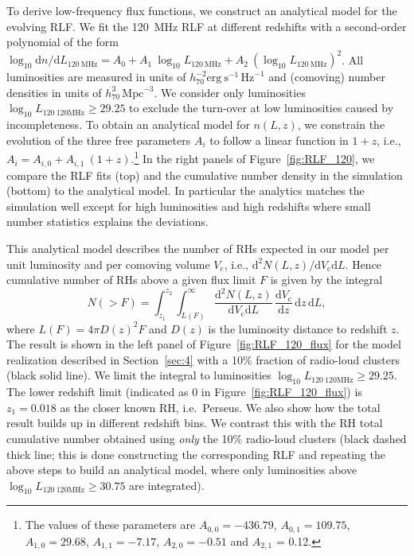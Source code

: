 \documentclass[traditabstract]{aa}
\newcommand{\rmn}{\mathrm}
\begin{document}
To derive low-frequency flux functions, we construct an analytical model for the
evolving RLF. We fit the 120~MHz RLF at different redshifts with a second-order
polynomial of the form $\log_{10} \rmn{d}n/\rmn{d}L_{120~\rmn{MHz}} = A_{0} +
A_{1}~\log_{10} L_{120~\rmn{MHz}} + A_{2}~(\log_{10} L_{120~\rmn{MHz}})^{2}$.
All luminosities are measured in units of $h_{70}^{-2}
\rmn{erg~s}^{-1}\,\rmn{Hz}^{-1}$ and (comoving) number densities in units of
$h_{70}^{3}\,\rmn{Mpc}^{-3}$. We consider only luminosities $\log_{10}
L_{120~\rmn{120MHz}} \geq 29.25$ to exclude the turn-over at low luminosities
caused by incompleteness. To obtain an analytical model for $n(L,z)$, we
constrain the evolution of the three free parameters $A_i$ to follow a linear
function in $1+z$, i.e., $A_{i} = A_{i,0} + A_{i,1}~(1+z)$.\footnote{The values
  of these parameters are $A_{0,0} = -436.79$, $A_{0,1} = 109.75$, $A_{1,0} =
  29.68$, $A_{1,1} = -7.17$, $A_{2,0} = -0.51$ and $A_{2,1}$ = 0.12.} In the
right panels of Figure~\ref{fig:RLF_120}, we compare the RLF fits (top) and the
cumulative number density in the simulation (bottom) to the analytical model. In
particular the analytics matches the simulation well except for high
luminosities and high redshifts where small number statistics explains the
deviations.

This analytical model describes the number of RHs expected in our model per unit
luminosity and per comoving volume $V_{\rmn{c}}$, i.e., $\rmn{d}^2N(L,z)
/\rmn{d}V_{\rmn{c}}\rmn{d}L$. Hence cumulative number of RHs above a given flux
limit $F$ is given by the integral
\begin{equation}
N(>F)  =  \int_{z_1}^{z_2} \int_{L(F)}^{\infty} 
\frac{\rmn{d}^2N(L,z)}{\rmn{d}V_{\rmn{c}}\rmn{d}L}\,
\frac{\rmn{d}V_{\rmn{c}}}{\rmn{d}z}\, \rmn{d}z\, \rmn{d}L ,
\label{eq:NtotRH}
\end{equation}
where $L(F) = 4 \pi D(z)^2 F$ and $D(z)$ is the luminosity distance to redshift
$z$.  The result is shown in the left panel of Figure~\ref{fig:RLF_120_flux} for
the model realization described in Section~\ref{sec:4} with a 10\% fraction of
radio-loud clusters (black solid line). We limit the integral to luminosities
$\log_{10} L_{120~\rmn{120MHz}} \geq 29.25$.
The lower redshift limit (indicated as 0 in Figure~\ref{fig:RLF_120_flux}) is
$z_{1} = 0.018$ as the closer known RH, i.e.~Perseus. We also show how the total
result builds up in different redshift bins. We contrast this with the RH total
cumulative number obtained using \emph{only} the 10\% radio-loud clusters (black
dashed thick line; this is done constructing the corresponding RLF and repeating
the above steps to build an analytical model, where only luminosities above
$\log_{10} L_{120~\rmn{120MHz}} \geq 30.75$ are integrated).
\end{document}
